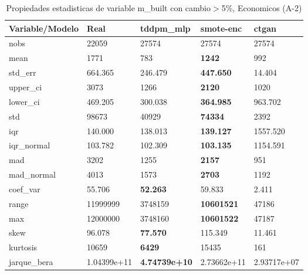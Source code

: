\begin{table}[H]
\centering
\fontsize{8}{14}\selectfont
\caption{Propiedades estadisticas de variable m\_built con cambio\ensuremath{>}5\%, Economicos (A-2)}
\label{table-stats-economicos-a-2-m_built-short}
\begin{tabular}{|l|m{10em}|m{10em}|m{10em}|m{10em}|}
\hline
 \rowcolor[gray]{0.8}
Variable/Modelo & Real & tddpm\_mlp & smote-enc & ctgan \\
\hline nobs & 22059 & 27574 & 27574 & 27574 \\
\hline mean & 1771 & \cellcolor[rgb]{0.9, 0.54, 0.52} 783 & \bfseries 1242 & 992 \\
\hline std\_err & 664.365 & 246.479 & \bfseries 447.650 & \cellcolor[rgb]{0.9, 0.54, 0.52} 14.404 \\
\hline upper\_ci & 3073 & 1266 & \bfseries 2120 & \cellcolor[rgb]{0.9, 0.54, 0.52} 1020 \\
\hline lower\_ci & 469.205 & 300.038 & \bfseries 364.985 & \cellcolor[rgb]{0.9, 0.54, 0.52} 963.702 \\
\hline std & 98673 & 40929 & \bfseries 74334 & \cellcolor[rgb]{0.9, 0.54, 0.52} 2392 \\
\hline iqr & 140.000 & 138.013 & \bfseries 139.127 & \cellcolor[rgb]{0.9, 0.54, 0.52} 1557.520 \\
\hline iqr\_normal & 103.782 & 102.309 & \bfseries 103.135 & \cellcolor[rgb]{0.9, 0.54, 0.52} 1154.591 \\
\hline mad & 3202 & 1255 & \bfseries 2157 & \cellcolor[rgb]{0.9, 0.54, 0.52} 951 \\
\hline mad\_normal & 4013 & 1573 & \bfseries 2703 & \cellcolor[rgb]{0.9, 0.54, 0.52} 1192 \\
\hline coef\_var & 55.706 & \bfseries 52.263 & 59.833 & \cellcolor[rgb]{0.9, 0.54, 0.52} 2.411 \\
\hline range & 11999999 & 3748159 & \bfseries 10601521 & \cellcolor[rgb]{0.9, 0.54, 0.52} 47186 \\
\hline max & 12000000 & 3748160 & \bfseries 10601522 & \cellcolor[rgb]{0.9, 0.54, 0.52} 47187 \\
\hline skew & 96.078 & \bfseries 77.570 & 115.349 & \cellcolor[rgb]{0.9, 0.54, 0.52} 11.461 \\
\hline kurtosis & 10659 & \bfseries 6429 & 15435 & \cellcolor[rgb]{0.9, 0.54, 0.52} 161 \\
\hline jarque\_bera & 1.04399e+11 & \bfseries 4.74739e+10 & \cellcolor[rgb]{0.9, 0.54, 0.52} 2.73662e+11 & 2.93717e+07 \\

\end{tabular}
\end{table}

